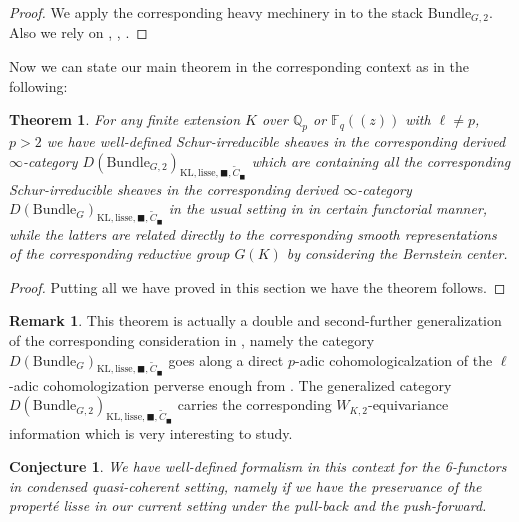 \documentclass[12pt]{book}
\newtheorem{conjecture}{Conjecture}
\newtheorem{theorem}{Theorem}
\theoremstyle{definition}
\newtheorem{remark}{Remark}
\begin{document}
\begin{proof}
We apply the corresponding heavy mechinery in \cite[Chapter V, Chapter VII]{FS} to the stack $\mathrm{Bundle}_{G,2}$. Also we rely on \cite{SchIII}, \cite{CSI}, \cite{CSII}.
\end{proof}

Now we can state our main theorem in the corresponding context as in the following:

\begin{theorem}
For any finite extension $K$ over $\mathbb{Q}_p$ or $\mathbb{F}_q((z))$ with $\ell\neq p$, $p>2$ we have well-defined Schur-irreducible sheaves in the corresponding derived $\infty$-category $D(\mathrm{Bundle}_{G,2})_{\text{KL},\mathrm{lisse},\blacksquare,\widetilde{C}_\blacksquare}$ which are containing all the corresponding Schur-irreducible sheaves in the corresponding derived $\infty$-category $D(\mathrm{Bundle}_{G})_{\text{KL},\mathrm{lisse},\blacksquare,\widetilde{C}_\blacksquare}$ in the usual setting in \cite{FS} in certain functorial manner, while the latters are related directly to the corresponding smooth representations of the corresponding reductive group $G(K)$ by considering the Bernstein center.
\end{theorem}

\begin{proof}
Putting all we have proved in this section we have the theorem follows.
\end{proof}



\begin{remark}
This theorem is actually a double and second-further generalization of the corresponding consideration in \cite{FS}, namely the category $D(\mathrm{Bundle}_{G})_{\text{KL},\mathrm{lisse},\blacksquare,\widetilde{C}_\blacksquare}$ goes along a direct $p$-adic cohomologicalzation of the $\ell$-adic cohomologization perverse enough from \cite{FS}. The generalized category $D(\mathrm{Bundle}_{G,2})_{\text{KL},\mathrm{lisse},\blacksquare,\widetilde{C}_\blacksquare}$ carries the corresponding $W_{K,2}$-equivariance information which is very interesting to study.
\end{remark}

\begin{conjecture}
We have well-defined formalism in this context for the 6-functors in condensed quasi-coherent setting, namely if we have the preservance of the \textit{propert\'e lisse} in our current setting under the pull-back and the push-forward.
\end{conjecture}
\end{document}
